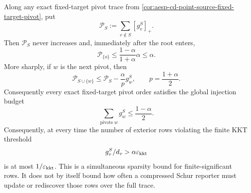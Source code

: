 \begin{lemma}
\label{lem:aesp-cd-point-source-residual-mass}
Along any exact fixed-target pivot trace from
\cref{cor:aesp-cd-point-source-fixed-target-pivot}, put
\begin{equation*}
 \mathcal P_S:=\sum_{v\notin S}[g^S_v]_+.
\end{equation*}
Then \(\mathcal P_S\) never increases and, immediately after the root
enters,
\begin{equation}
 \mathcal P_{\{o\}}\leq\frac{1-\alpha}{1+\alpha}\alpha
 \leq\alpha.
 \label{eq:aesp-cd-point-source-residual-mass}
\end{equation}
More sharply, if \(w\) is the next pivot, then
\begin{equation}
 \mathcal P_{S\cup\{w\}}
 \leq\mathcal P_S-\frac{\alpha}{p}g^S_w,
 \qquad p=\frac{1+\alpha}{2}.
 \label{eq:aesp-cd-point-source-residual-mass-drop}
\end{equation}
Consequently every exact fixed-target pivot order satisfies the global
injection budget
\begin{equation}
 \sum_{\text{pivots }w}g^S_w\leq\frac{1-\alpha}{2}.
 \label{eq:aesp-cd-point-source-pivot-injection}
\end{equation}
Consequently, at every time the number of exterior rows violating the finite
KKT threshold
\begin{equation*}
 g^S_v/d_v>\alpha\varepsilon_{\mathrm{kkt}}
\end{equation*}
is at most \(1/\varepsilon_{\mathrm{kkt}}\).  This is a simultaneous sparsity bound for
finite-significant rows.  It does not by itself bound how often a compressed
Schur reporter must update or rediscover those rows over the full trace.
\end{lemma}

